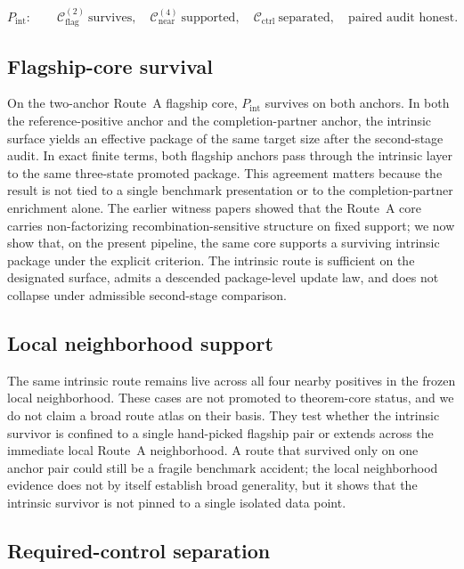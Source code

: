 \documentclass[11pt]{article}
\theoremstyle{definition}
\begin{document}
\[
P_{\mathrm{int}}:\qquad
\mathcal C_{\mathrm{flag}}^{(2)}\ \text{survives},\quad
\mathcal C_{\mathrm{near}}^{(4)}\ \text{supported},\quad
\mathcal C_{\mathrm{ctrl}}\ \text{separated},\quad
\text{paired audit honest}.
\]

\subsection{Flagship-core survival}

On the two-anchor Route~A flagship core, $P_{\mathrm{int}}$ survives on both anchors. In both the reference-positive anchor and the completion-partner anchor, the intrinsic surface yields an effective package of the same target size after the second-stage audit. In exact finite terms, both flagship anchors pass through the intrinsic layer to the same three-state promoted package. This agreement matters because the result is not tied to a single benchmark presentation or to the completion-partner enrichment alone. The earlier witness papers showed that the Route~A core carries non-factorizing recombination-sensitive structure on fixed support; we now show that, on the present pipeline, the same core supports a surviving intrinsic package under the explicit criterion. The intrinsic route is sufficient on the designated surface, admits a descended package-level update law, and does not collapse under admissible second-stage comparison.

\subsection{Local neighborhood support}

The same intrinsic route remains live across all four nearby positives in the frozen local neighborhood. These cases are not promoted to theorem-core status, and we do not claim a broad route atlas on their basis. They test whether the intrinsic survivor is confined to a single hand-picked flagship pair or extends across the immediate local Route~A neighborhood. A route that survived only on one anchor pair could still be a fragile benchmark accident; the local neighborhood evidence does not by itself establish broad generality, but it shows that the intrinsic survivor is not pinned to a single isolated data point.

\subsection{Required-control separation}
\end{document}
